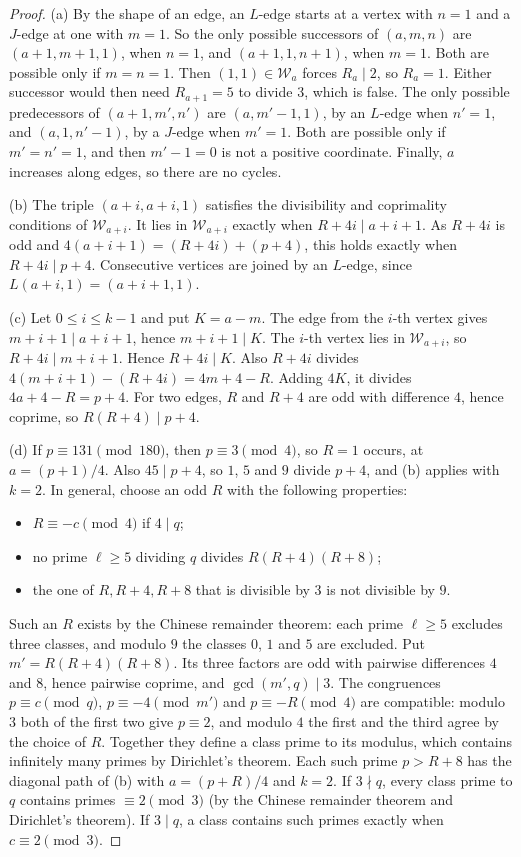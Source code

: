 \begin{proof}
(a) By the shape of an edge, an $L$-edge starts at a vertex with $n=1$ and a $J$-edge at one with $m=1$. So the only possible successors of $(a,m,n)$ are $(a+1,m+1,1)$, when $n=1$, and $(a+1,1,n+1)$, when $m=1$. Both are possible only if $m=n=1$. Then $(1,1)\in\mathcal W_a$ forces $R_a\mid2$, so $R_a=1$. Either successor would then need $R_{a+1}=5$ to divide $3$, which is false.
The only possible predecessors of $(a+1,m',n')$ are $(a,m'-1,1)$, by an $L$-edge when $n'=1$, and $(a,1,n'-1)$, by a $J$-edge when $m'=1$. Both are possible only if $m'=n'=1$, and then $m'-1=0$ is not a positive coordinate.
Finally, $a$ increases along edges, so there are no cycles.

(b) The triple $(a+i,a+i,1)$ satisfies the divisibility and coprimality conditions of $\mathcal W_{a+i}$. It lies in $\mathcal W_{a+i}$ exactly when $R+4i\mid a+i+1$. As $R+4i$ is odd and $4(a+i+1)=(R+4i)+(p+4)$, this holds exactly when $R+4i\mid p+4$. Consecutive vertices are joined by an $L$-edge, since $L(a+i,1)=(a+i+1,1)$.

(c) Let $0\le i\le k-1$ and put $K=a-m$. The edge from the $i$-th vertex gives $m+i+1\mid a+i+1$, hence $m+i+1\mid K$. The $i$-th vertex lies in $\mathcal W_{a+i}$, so $R+4i\mid m+i+1$. Hence $R+4i\mid K$. Also $R+4i$ divides $4(m+i+1)-(R+4i)=4m+4-R$. Adding $4K$, it divides $4a+4-R=p+4$. For two edges, $R$ and $R+4$ are odd with difference $4$, hence coprime, so $R(R+4)\mid p+4$.

(d) If $p\equiv131\pmod{180}$, then $p\equiv3\pmod4$, so $R=1$ occurs, at $a=(p+1)/4$. Also $45\mid p+4$, so $1$, $5$ and $9$ divide $p+4$, and (b) applies with $k=2$.
In general, choose an odd $R$ with the following properties:
\begin{itemize}
\item $R\equiv-c\pmod4$ if $4\mid q$;
\item no prime $\ell\ge5$ dividing $q$ divides $R(R+4)(R+8)$;
\item the one of $R,R+4,R+8$ that is divisible by $3$ is not divisible by $9$.
\end{itemize}
Such an $R$ exists by the Chinese remainder theorem: each prime $\ell\ge5$ excludes three classes, and modulo $9$ the classes $0$, $1$ and $5$ are excluded.
Put $m'=R(R+4)(R+8)$. Its three factors are odd with pairwise differences $4$ and $8$, hence pairwise coprime, and $\gcd(m',q)\mid3$.
The congruences $p\equiv c\pmod q$, $p\equiv-4\pmod{m'}$ and $p\equiv-R\pmod4$ are compatible: modulo $3$ both of the first two give $p\equiv2$, and modulo $4$ the first and the third agree by the choice of $R$. Together they define a class prime to its modulus, which contains infinitely many primes by Dirichlet's theorem. Each such prime $p>R+8$ has the diagonal path of (b) with $a=(p+R)/4$ and $k=2$.
If $3\nmid q$, every class prime to $q$ contains primes $\equiv2\pmod3$ (by the Chinese remainder theorem and Dirichlet's theorem). If $3\mid q$, a class contains such primes exactly when $c\equiv2\pmod3$.


\end{proof}
